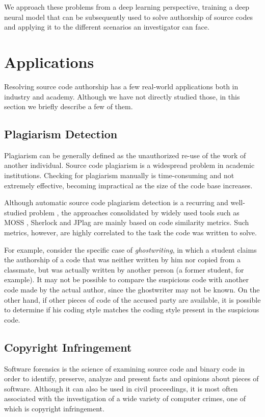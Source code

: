We approach these problems from a deep learning perspective, training a deep neural model that can be subsequently used to solve authorship of source codes and applying it to the different scenarios an investigator can face.

\section{Applications}

Resolving source code authorship has a few real-world applications both in industry and academy. Although we have not directly studied those, in this section we briefly describe a few of them.

\subsection{Plagiarism Detection}

Plagiarism can be generally defined as the unauthorized re-use of the work of another individual. Source code plagiarism is a widespread problem in academic institutions. Checking for plagiarism manually is time-consuming and not extremely effective, becoming impractical as the size of the code base increases.

Although automatic source code plagiarism detection is a recurring and well-studied problem \cite{plag_survey}, the approaches consolidated by widely used tools such as MOSS \cite{moss}, Sherlock \cite{sherlock} and JPlag \cite{jplag} are mainly based on code similarity metrics. Such metrics, however, are highly correlated to the task the code was written to solve.

For example, consider the specific case of \textit{ghostwriting}, in which a student claims the authorship of a code that was neither written by him nor copied from a classmate, but was actually written by another person (a former student, for example).  It may not be possible to compare the suspicious code with another code made by the actual author, since the ghostwriter may not be known. On the other hand, if other pieces of code of the accused party are available, it is possible to determine if his coding style matches the coding style present in the suspicious code.

\subsection{Copyright Infringement}

Software forensics is the science of examining source code and binary code in order to identify, preserve, analyze and present facts and opinions about pieces of software. Although it can also be used in civil proceedings, it is most often associated with the investigation of a wide variety of computer crimes, one of which is copyright infringement.

